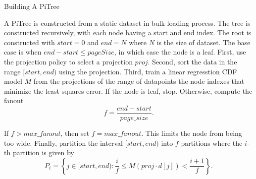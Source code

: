 \documentclass[sigconf,10pt]{acmart}
\begin{document}
\begin{algorithm}
  \caption{Building A PiTree}
\end{algorithm}

A PiTree is constructed from a static dataset in bulk loading process.
The tree is constructed recursively, with each node having a start and 
end index. The root is constructed with $start=0$ and $end=N$ where $N$
is the size of dataset. The base case is when $end - start \leq pageSize$,
in which case the node is a leaf.
First, use the projection policy to select a projection $proj$.
Second, sort the data in the range $[start, end)$ using the projection.
Third, train a linear regresstion CDF model $M$ from the projections of the range of datapoints
the node indexes that minimize the least squares error. If the node is leaf, stop. Otherwise,
compute the fanout
\[
  f = \frac{end - start}{page\_size}.
\]

If $f > max\_fanout$, then set $f = max\_fanout$. This limits
the node from being too wide. 
Finally, partition the interval $[start, end)$ into $f$ partitions
where the $i$-th partition is given by
\[
  P_i = \left\{j \in [start, end): \frac{i}{f} \leq M(proj \cdot d[j]) < \frac{i+1}{f} \right\}.
\]
\end{document}
